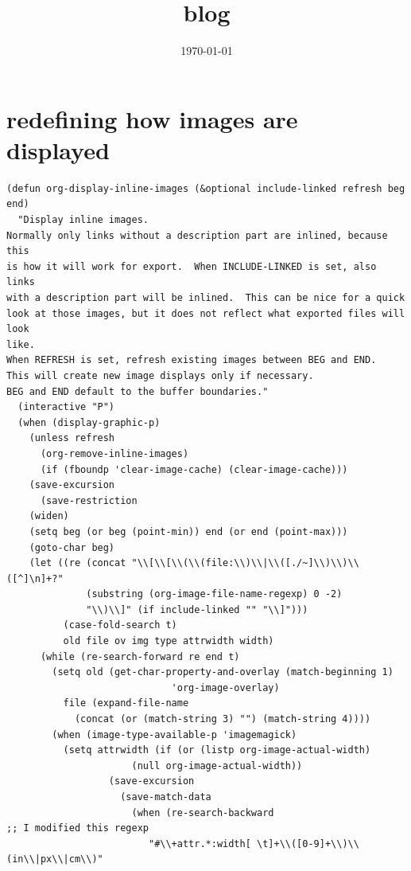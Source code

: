 \documentclass[aps,prb,citeautoscript,preprint,citeautoscript,showkeys]{revtex4-1}
\date{\today}
\title{blog}
\begin{document}
\section{redefining how images are displayed}
\label{sec-1}

\begin{verbatim}
(defun org-display-inline-images (&optional include-linked refresh beg end)
  "Display inline images.
Normally only links without a description part are inlined, because this
is how it will work for export.  When INCLUDE-LINKED is set, also links
with a description part will be inlined.  This can be nice for a quick
look at those images, but it does not reflect what exported files will look
like.
When REFRESH is set, refresh existing images between BEG and END.
This will create new image displays only if necessary.
BEG and END default to the buffer boundaries."
  (interactive "P")
  (when (display-graphic-p)
    (unless refresh
      (org-remove-inline-images)
      (if (fboundp 'clear-image-cache) (clear-image-cache)))
    (save-excursion
      (save-restriction
	(widen)
	(setq beg (or beg (point-min)) end (or end (point-max)))
	(goto-char beg)
	(let ((re (concat "\\[\\[\\(\\(file:\\)\\|\\([./~]\\)\\)\\([^]\n]+?"
			  (substring (org-image-file-name-regexp) 0 -2)
			  "\\)\\]" (if include-linked "" "\\]")))
	      (case-fold-search t)
	      old file ov img type attrwidth width)
	  (while (re-search-forward re end t)
	    (setq old (get-char-property-and-overlay (match-beginning 1)
						     'org-image-overlay)
		  file (expand-file-name
			(concat (or (match-string 3) "") (match-string 4))))
	    (when (image-type-available-p 'imagemagick)
	      (setq attrwidth (if (or (listp org-image-actual-width)
				      (null org-image-actual-width))
				  (save-excursion
				    (save-match-data
				      (when (re-search-backward
;; I modified this regexp
					     "#\\+attr.*:width[ \t]+\\([0-9]+\\)\\(in\\|px\\|cm\\)"

\end{verbatim}
\end{document}
